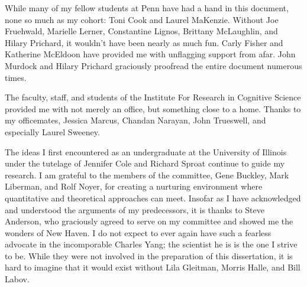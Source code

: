 While many of my fellow students at Penn have had a hand in this document, none so much as my cohort: Toni Cook and Laurel MaKenzie. 
Without Joe Fruehwald, Marielle Lerner, Constantine Lignos, Brittany McLaughlin, and Hilary Prichard, it wouldn't have been nearly as much fun. 
Carly Fisher and Katherine McEldoon have provided me with unflagging support from afar. 
John Murdock and Hilary Prichard graciously proofread the entire document numerous times.

The faculty, staff, and students of the Institute For Research in Cognitive Science provided me with not merely an office, but something close to a home. 
Thanks to my officemates, Jessica Marcus, Chandan Narayan, John Trueswell, and especially Laurel Sweeney.

The ideas I first encountered as an undergraduate at the University of Illinois under the tutelage of Jennifer Cole and Richard Sproat continue to guide my research. 
I am grateful to the members of the committee, Gene Buckley, Mark Liberman, and Rolf Noyer, for creating a nurturing environment where quantitative and theoretical approaches can meet. 
Insofar as I have acknowledged and understood the arguments of my predecessors, it is thanks to Steve Anderson, who graciously agreed to serve on my committee and showed me the wonders of New Haven. 
I do not expect to ever again have such a fearless advocate in the incomporable Charles Yang; the scientist he is is the one I strive to be.
While they were not involved in the preparation of this dissertation, it is hard to imagine that it would exist without Lila Gleitman, Morris Halle, and Bill Labov. 
